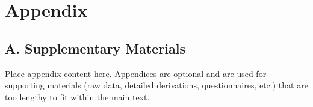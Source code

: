 \chapter*{Appendix}

\section*{A. Supplementary Materials}

Place appendix content here. Appendices are optional and are used for
supporting materials (raw data, detailed derivations, questionnaires, etc.)
that are too lengthy to fit within the main text.
